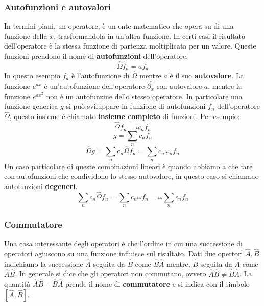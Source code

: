 \subsubsection{Autofunzioni e autovalori}
In termini piani, un operatore, è un ente matematico che opera su di una funzione della $x$, trasformandola in un'altra funzione. In certi casi il risultato dell'operatore è la stessa funzione di partenza moltiplicata per un valore. Queste funzioni prendono il nome di \textbf{autofunzioni} dell'operatore.
$$\hat{\Omega} f_a = a f_a$$
In questo esempio $f_a$ è l'autofunzione di $\hat{\Omega}$ mentre $a$ è il suo \textbf{autovalore}. La funzione $e^{ax}$ è un'autofunzione dell'operatore $\hat{\partial{}_x}$ con autovalore $a$, mentre la funzione $e^{ax^2}$ non è un autofunzine dello stesso operatore. In particolare una funzione generica $g$ si può sviluppare in funzione di autofunzioni $f_n$ dell'operatore $\hat{\Omega}$, questo insieme è chiamato \textbf{insieme completo} di funzioni. Per esempio:
$$\hat{\Omega} f_n = \omega_n f_n$$
$$g = \sum_n c_n f_n$$
$$\hat{\Omega} g = \sum_n c_n \hat{\Omega} f_n = \sum_n c_n \omega_n f_n$$
Un caso particolare di queste combinazioni lineari è quando abbiamo a che fare con autofunzioni che condividono lo stesso autovalore, in questo caso si chiamano autofunzioni \textbf{degeneri}.
$$\sum_n c_n \hat{\Omega} f_n = \sum_n c_n \omega f_n = \omega \sum_n c_n f_n$$

\subsubsection{Commutatore}
Una cosa interessante degli operatori è che l'ordine in cui una successione di operatori agiuscono su una funzione influisce sul risultato. Dati due opertori $\hat{A}, \hat{B}$ indichiamo la successione $\hat{A}$ seguita da $\hat{B}$ come $\hat{B}\hat{A}$ mentre, $\hat{B}$ seguita da $\hat{A}$ come $\hat{A}\hat{B}$.
In generale si dice che gli operatori non commutano, ovvero $\hat{A}\hat{B} \ne \hat{B}\hat{A}$. La quantità $\hat{A}\hat{B} - \hat{B}\hat{A}$ prende il nome di \textbf{commutatore} e si indica con il simbolo $[\hat{A},\hat{B}]$.

